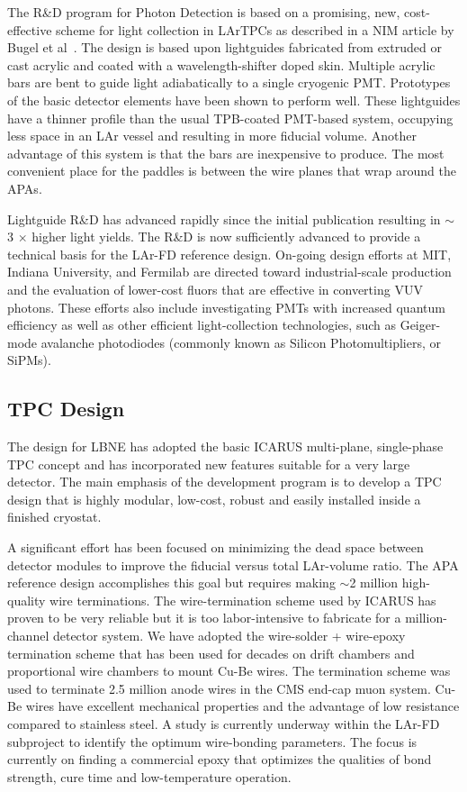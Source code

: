 The R\&D program  for Photon Detection is based on a promising, new, cost-effective scheme for light collection in LArTPCs as described in a NIM article by Bugel et al~\cite{lightGuides}. The design is based upon lightguides fabricated from extruded or cast acrylic and coated with a wavelength-shifter doped skin.  Multiple acrylic bars are bent to guide light adiabatically to a single cryogenic PMT. Prototypes of the basic detector elements have been shown to perform well.  These lightguides have a thinner profile than the usual TPB-coated PMT-based system, occupying less space in an LAr vessel and resulting in more fiducial volume.  Another advantage of this system is that the bars are inexpensive to produce. The most convenient place for the paddles is between the wire planes that wrap around the APAs.

Lightguide R\&D has advanced rapidly since the initial publication resulting in $\sim$3 $\times$ higher light yields. The R\&D is now sufficiently advanced to provide a technical basis for the LAr-FD reference design. On-going design efforts at MIT, Indiana University, and Fermilab are directed toward industrial-scale production and the evaluation of lower-cost fluors that are effective in converting VUV photons. These efforts also include investigating PMTs with increased quantum efficiency as well as other efficient light-collection technologies, such as Geiger-mode avalanche photodiodes (commonly known as Silicon Photomultipliers, or SiPMs).

\subsection{TPC Design}
The design for LBNE has adopted the basic ICARUS multi-plane, single-phase TPC
concept and has incorporated new features suitable for a very large
detector.  The main emphasis of the development program is to develop a TPC design that is highly modular, low-cost, robust and easily installed inside a finished cryostat.

A significant effort has been focused on minimizing the dead space between detector modules to improve
the fiducial versus total LAr-volume ratio. The APA reference design accomplishes this goal but requires making $\sim$2 million high-quality wire terminations. The wire-termination scheme used by ICARUS has proven to be very reliable but it is too labor-intensive to fabricate for a million-channel detector system. We have adopted the wire-solder + wire-epoxy termination scheme that has been used for decades on drift chambers and proportional wire chambers to mount Cu-Be wires. The termination scheme was used to terminate 2.5 million  anode wires in the CMS end-cap muon system. Cu-Be wires have excellent mechanical properties and the advantage of low resistance compared to stainless steel. A study is currently underway within the LAr-FD subproject to identify the optimum wire-bonding parameters. The focus is currently on finding a commercial epoxy that optimizes the qualities of bond strength, cure time and low-temperature operation.

